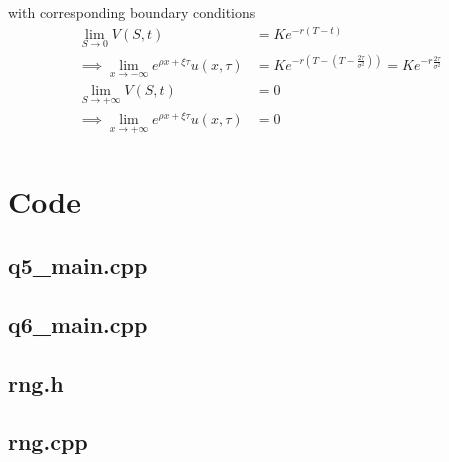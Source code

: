 \documentclass[12pt]{article}
\begin{document}
with corresponding boundary conditions
\begin{align*}
	\lim_{S\to 0} V(S, t) &= Ke^{-r(T - t)} \\
	\implies \lim_{x \to -\infty} e^{\rho x + \xi \tau} u(x, \tau) &= Ke^{-r(T - (T - \frac{2\tau}{\sigma^2}))} = Ke^{-r\frac{2\tau}{\sigma^2}} \\ 
	\lim_{S\to +\infty} V(S, t) &= 0 \\
	\implies \lim_{x \to +\infty} e^{\rho x + \xi \tau} u(x, \tau) &= 0 \\ 
\end{align*}

\newpage
\section{Code}
\subsection{q5\_main.cpp}

\subsection{q6\_main.cpp}

\subsection{rng.h}

\subsection{rng.cpp}

\end{document}
